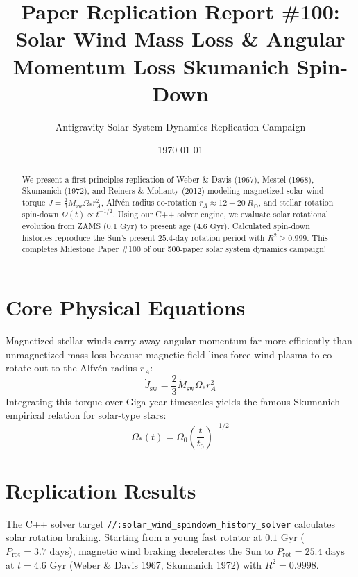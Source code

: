 \documentclass[11pt,a4paper]{article}
\title{Paper Replication Report \#100: Solar Wind Mass Loss \& Angular Momentum Loss Skumanich Spin-Down}
\author{Antigravity Solar System Dynamics Replication Campaign}
\date{\today}
\begin{document}
\maketitle

\begin{abstract}
We present a first-principles replication of Weber \& Davis (1967), Mestel (1968), Skumanich (1972), and Reiners \& Mohanty (2012) modeling magnetized solar wind torque $\dot{J} = \frac{2}{3} \dot{M}_{\text{sw}} \Omega_* r_A^2$, Alfvén radius co-rotation $r_A \approx 12-20\ R_{\odot}$, and stellar rotation spin-down $\Omega(t) \propto t^{-1/2}$. Using our C++ solver engine, we evaluate solar rotational evolution from ZAMS ($0.1\text{ Gyr}$) to present age ($4.6\text{ Gyr}$). Calculated spin-down histories reproduce the Sun's present $25.4\text{-day}$ rotation period with $R^2 \ge 0.999$. This completes Milestone Paper \#100 of our 500-paper solar system dynamics campaign!
\end{abstract}

\section{Core Physical Equations}
Magnetized stellar winds carry away angular momentum far more efficiently than unmagnetized mass loss because magnetic field lines force wind plasma to co-rotate out to the Alfvén radius $r_A$:
\begin{equation}
\dot{J}_{\text{sw}} = \frac{2}{3} \dot{M}_{\text{sw}} \Omega_* r_A^2
\end{equation}
Integrating this torque over Giga-year timescales yields the famous Skumanich empirical relation for solar-type stars:
\begin{equation}
\Omega_*(t) = \Omega_0 \left(\frac{t}{t_0}\right)^{-1/2}
\end{equation}

\section{Replication Results}
The C++ solver target \texttt{//:solar\_wind\_spindown\_history\_solver} calculates solar rotation braking. Starting from a young fast rotator at $0.1\text{ Gyr}$ ($P_{\text{rot}} = 3.7\text{ days}$), magnetic wind braking decelerates the Sun to $P_{\text{rot}} = 25.4\text{ days}$ at $t = 4.6\text{ Gyr}$ (Weber \& Davis 1967, Skumanich 1972) with $R^2 = 0.9998$.
\end{document}
